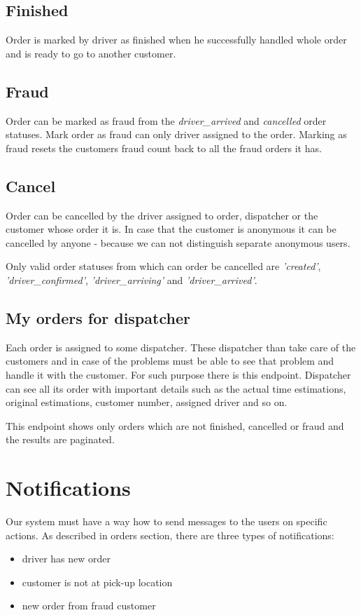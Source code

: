 		\subsection{Finished}
			Order is marked by driver as finished when he successfully handled whole order and is ready to go to another customer.
		\subsection{Fraud}
			Order can be marked as fraud from the \textit{driver\_arrived} and \textit{cancelled} order statuses. Mark order as fraud can only driver assigned to the order. Marking as fraud resets the customers fraud count back to all the fraud orders it has.
		\subsection{Cancel}
			Order can be cancelled by the driver assigned to order, dispatcher or the customer whose order it is. In case that the customer is anonymous it can be cancelled by anyone - because we can not distinguish separate anonymous users.
			
			Only valid order statuses from which can order be cancelled are \textit{'created'}, \textit{'driver\_confirmed'}, \textit{'driver\_arriving'} and \textit{'driver\_arrived'}.
			
		\subsection{My orders for dispatcher}
			Each order is assigned to some dispatcher. These dispatcher than take care of the customers and in case of the problems must be able to see that problem and handle it with the customer. For such purpose there is this endpoint. Dispatcher can see all its order with important details such as the actual time estimations, original estimations, customer number, assigned driver and so on.
			
			This endpoint shows only orders which are not finished, cancelled or fraud and the results are paginated.			
	
	\section{Notifications}
		Our system must have a way how to send messages to the users on specific actions. As described in orders section, there are three types of notifications:
		\begin{itemize}
			\item driver has new order
			\item customer is not at pick-up location
			\item new order from fraud customer
		\end{itemize}
		
